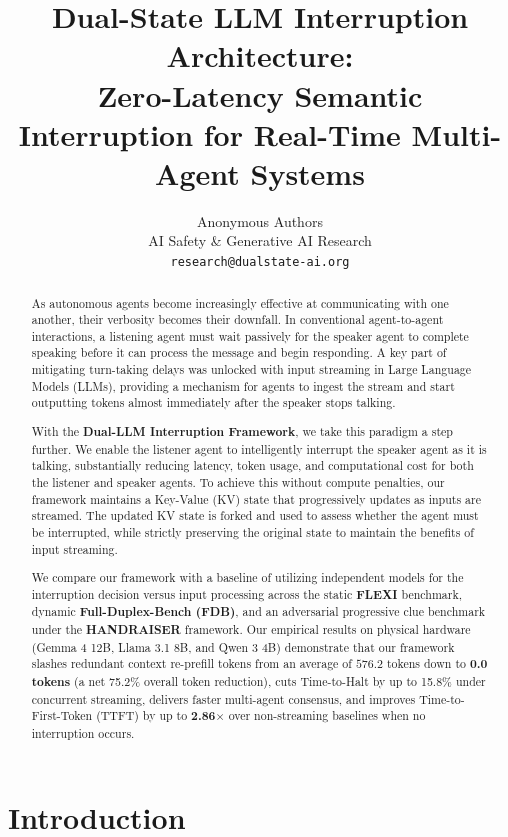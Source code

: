 \documentclass{article}
\title{Dual-State LLM Interruption Architecture: \\ Zero-Latency Semantic Interruption for Real-Time Multi-Agent Systems}
\author{%
  Anonymous Authors \\
  AI Safety \& Generative AI Research \\
  \texttt{research@dualstate-ai.org} \\
}
\begin{document}
\maketitle

\begin{abstract}
As autonomous agents become increasingly effective at communicating with one another, their verbosity becomes their downfall. In conventional agent-to-agent interactions, a listening agent must wait passively for the speaker agent to complete speaking before it can process the message and begin responding. A key part of mitigating turn-taking delays was unlocked with input streaming in Large Language Models (LLMs), providing a mechanism for agents to ingest the stream and start outputting tokens almost immediately after the speaker stops talking.

With the \textbf{Dual-LLM Interruption Framework}, we take this paradigm a step further. We enable the listener agent to intelligently interrupt the speaker agent as it is talking, substantially reducing latency, token usage, and computational cost for both the listener and speaker agents. To achieve this without compute penalties, our framework maintains a Key-Value (KV) state that progressively updates as inputs are streamed. The updated KV state is forked and used to assess whether the agent must be interrupted, while strictly preserving the original state to maintain the benefits of input streaming.

We compare our framework with a baseline of utilizing independent models for the interruption decision versus input processing across the static \textbf{FLEXI} benchmark, dynamic \textbf{Full-Duplex-Bench (FDB)}, and an adversarial progressive clue benchmark under the \textbf{HANDRAISER} framework. Our empirical results on physical hardware (Gemma 4 12B, Llama 3.1 8B, and Qwen 3 4B) demonstrate that our framework slashes redundant context re-prefill tokens from an average of $576.2$ tokens down to \textbf{0.0 tokens} (a net 75.2\% overall token reduction), cuts Time-to-Halt by up to 15.8\% under concurrent streaming, delivers faster multi-agent consensus, and improves Time-to-First-Token (TTFT) by up to \textbf{2.86$\times$} over non-streaming baselines when no interruption occurs.
\end{abstract}

\section{Introduction}
\end{document}
